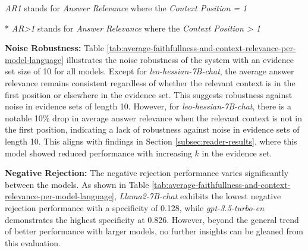 \begin{table}[H]
    \centering
    {\raggedright\footnotesize * \textit{AR1} stands for \textit{Answer Relevance} where the \textit{Context Position = 1}\par}
    {\raggedright\footnotesize ** \textit{AR>1} stands for \textit{Answer Relevance} where the \textit{Context Position > 1}\par}
    \caption{Multiple Metrics per Model and Language}
    \label{tab:average-faithfullness-and-context-relevance-per-model-language}
\end{table}

\noindent\textbf{Noise Robustness:} Table \ref{tab:average-faithfullness-and-context-relevance-per-model-language} illustrates the noise robustness of the system with an evidence set size of 10 for all models. Except for \textit{leo-hessian-7B-chat}, the average answer relevance remains consistent regardless of whether the relevant context is in the first position or elsewhere in the evidence set. This suggests robustness against noise in evidence sets of length 10. However, for \textit{leo-hessian-7B-chat}, there is a notable 10\% drop in average answer relevance when the relevant context is not in the first position, indicating a lack of robustness against noise in evidence sets of length 10. This aligns with findings in Section \ref{subsec:reader-results}, where this model showed reduced performance with increasing $k$ in the evidence set.

\noindent\textbf{Negative Rejection:} The negative rejection performance varies significantly between the models. As shown in Table \ref{tab:average-faithfullness-and-context-relevance-per-model-language}, \textit{Llama2-7B-chat} exhibits the lowest negative rejection performance with a specificity of 0.128, while \textit{gpt-3.5-turbo-en} demonstrates the highest specificity at 0.826. However, beyond the general trend of better performance with larger models, no further insights can be gleaned from this evaluation.




